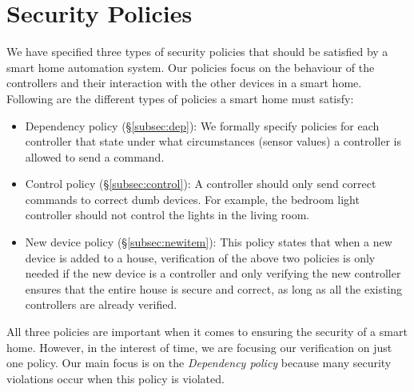 \documentclass{article}
\begin{document}
\section{Security Policies}
We have specified three types of security policies that should be satisfied by a smart home automation system. Our policies focus on the behaviour of the controllers and their interaction with the other devices in a smart home. Following are the different types of policies a smart home must satisfy: 
\begin{itemize}
\item Dependency policy (\S\ref{subsec:dep}): We formally specify policies for each controller that state under what circumstances (sensor values) a controller is allowed to send a command.

\item Control policy (\S\ref{subsec:control}): A controller should only send correct commands to correct dumb devices. For example, the bedroom light controller should not control the lights in the living room.

\item New device policy (\S\ref{subsec:newitem}): This policy states that when a new device is added to a house, verification of the above two policies is only needed if the new device is a controller and only verifying the new controller ensures that the entire house is secure and correct, as long as all the existing controllers are already verified.
\end{itemize}

All three policies are important when it comes to ensuring the security of a smart home. However, in the interest of time, we are focusing our verification on just one policy. Our main focus is on the \textit{Dependency policy} because many security violations occur when this policy is violated. 
\end{document}
